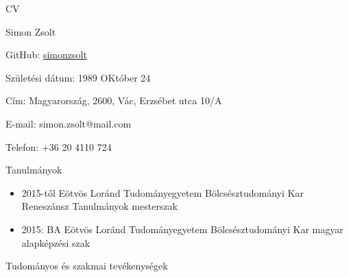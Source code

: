 \documentclass{article}
\begin{document}
CV

Simon Zsolt 

GitHub: \href{https://github.com/simonzsolt}{simonzsolt}

Születési dátum: 1989 OKtóber 24

Cím: Magyarország, 2600, Vác, Erzsébet utca 10/A

E-mail: simon.zsolt@mail.com

Telefon: +36 20 4110 724

Tanulmányok

\begin{itemize}

  \item{ 2015-től Eötvös Loránd Tudományegyetem Bölcsésztudományi Kar Reneszánsz Tanulmányok mesterszak }

  \item{ 2015: BA Eötvös Loránd Tudományegyetem Bölcsésztudományi Kar magyar alapképzési szak }

\end{itemize}

Tudományos és szakmai tevékenységek
\end{document}

